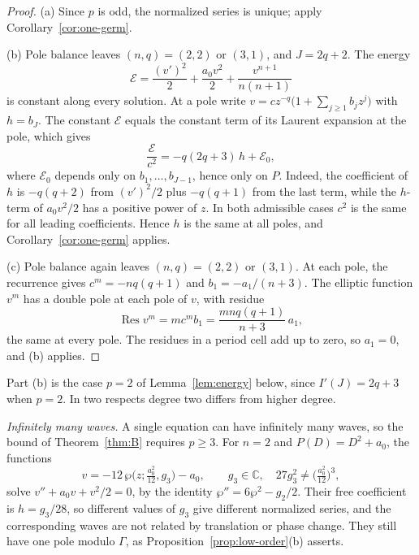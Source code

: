 \documentclass[11pt]{article}
\theoremstyle{definition}
\theoremstyle{remark}
\numberwithin{equation}{section}
\newcommand{\CC}{\mathbb C}
\DeclareMathOperator{\Res}{Res}
\begin{document}
\begin{proof}
(a) Since \(p\) is odd, the normalized series is unique; apply
Corollary~\ref{cor:one-germ}.

(b) Pole balance leaves \((n,q)=(2,2)\) or \((3,1)\), and \(J=2q+2\).
The energy
\[
 \mathcal E=\frac{(v')^2}{2}+\frac{a_0v^2}{2}+\frac{v^{n+1}}{n(n+1)}
\]
is constant along every solution. At a pole write
\(v=cz^{-q}\bigl(1+\sum_{j\ge1}b_jz^j\bigr)\) with \(h=b_J\). The
constant \(\mathcal E\) equals the constant term of its Laurent
expansion at the pole, which gives
\[
 \frac{\mathcal E}{c^2}=-q(2q+3)\,h+\mathcal E_0,
\]
where \(\mathcal E_0\) depends only on \(b_1,\dots,b_{J-1}\), hence
only on \(P\). Indeed, the coefficient of \(h\) is \(-q(q+2)\) from
\((v')^2/2\) plus \(-q(q+1)\) from the last term, while the \(h\)-term
of \(a_0v^2/2\) has a positive power of \(z\). In both admissible cases
\(c^2\) is the same for all leading coefficients. Hence \(h\) is the
same at all poles, and Corollary~\ref{cor:one-germ} applies.

(c) Pole balance again leaves \((n,q)=(2,2)\) or \((3,1)\). At each
pole, the recurrence gives \(c^m=-nq(q+1)\) and \(b_1=-a_1/(n+3)\).
The elliptic function \(v^m\) has a double pole at each pole of \(v\),
with residue
\[
 \Res v^m=mc^mb_1=\frac{mnq(q+1)}{n+3}\,a_1,
\]
the same at every pole. The residues in a period cell add up to zero,
so \(a_1=0\), and (b) applies.
\end{proof}

Part (b) is the case \(p=2\) of Lemma~\ref{lem:energy} below, since
\(I'(J)=2q+3\) when \(p=2\). In two respects degree two differs from
higher degree.

\emph{Infinitely many waves.}\label{sec:order-two} A single equation
can have infinitely many waves, so the bound of Theorem~\ref{thm:B}
requires \(p\ge3\). For \(n=2\) and \(P(D)=D^2+a_0\), the functions
\[
 v=-12\,\wp\bigl(z;\tfrac{a_0^2}{12},g_3\bigr)-a_0,\qquad
 g_3\in\CC,\quad 27g_3^2\ne\bigl(\tfrac{a_0^2}{12}\bigr)^3,
\]
solve \(v''+a_0v+v^2/2=0\), by the identity \(\wp''=6\wp^2-g_2/2\).
Their free coefficient is \(h=g_3/28\), so different values of \(g_3\)
give different normalized series, and the corresponding waves are not
related by translation or phase change. They still have one pole modulo
\(\Gamma\), as Proposition~\ref{prop:low-order}(b) asserts.
\end{document}
